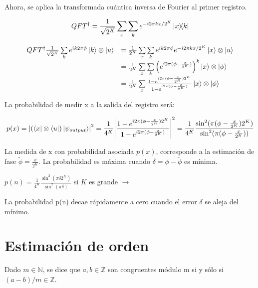 Ahora, se aplica la transformada cuántica inversa de Fourier al primer registro.

\begin{equation}
    QFT^\dagger = \frac{1}{\sqrt{2^K}} \sum\limits_x\sum\limits_k e^{-i 2\pi k x / 2^K} \ketbra{x}{k}
\end{equation}

\begin{equation}
\begin{array}{r l}
    QFT^\dagger \frac{1}{\sqrt{2^K}} \sum\limits_k e^{i k 2\pi \phi} \ket{k} \otimes \ket{u} &= \frac{1}{2^K} \sum\limits_x \sum\limits_k e^{i k 2\pi \phi} e^{-i 2\pi k x / 2^K} \ket{x} \otimes \ket{u} \\
    &= \frac{1}{2^K} \sum\limits_x\sum\limits_k \left(e^{i 2\pi (\phi - \frac{x}{2^K})}\right)^k \ket{x} \otimes \ket{\phi} \\
    &= \frac{1}{2^K} \sum\limits_x \frac{1 - e^{i 2\pi (\phi - \frac{x}{2^K}) 2^K}}{1 - e^{i 2\pi (\phi - \frac{x}{2^K})}} \ket{x} \otimes \ket{\phi} \\
\end{array}
\end{equation}

La probabilidad de medir x a la salida del registro será:

\begin{equation}
    p(x) = \abs{(\bra{x} \otimes \bra{u}) \ket{\psi_{output}}}^2 = \frac{1}{4^K} \abs{\frac{1 - e^{i 2\pi (\phi - \frac{x}{2^K})2^K}}{1 - e^{i 2\pi (\phi - \frac{x}{2^K})}}}^2 = \frac{1}{4^{K}} \frac{\sin^2(\pi (\phi - \frac{x}{2^K}) 2^K)}{\sin^2(\pi (\phi - \frac{x}{2^K}))}
\end{equation}

La medida de x con probabilidad asociada $p(x)$, corresponde a la estimación de fase $\tilde{\phi} = \frac{x}{2^K}$. La probabilidad es máxima cuando $\delta = \phi - \tilde{\phi}$ es mínima.

$p(n) = \frac{1}{4^K} \frac{\sin^2(\pi \delta 2^K)}{\sin^2(\pi \delta)}$ si $K$ es grande $\rightarrow$ %

La probabilidad p(n) decae rápidamente a cero cuando el error $\delta$ se aleja del mínimo.

\section{Estimación de orden}

Dado $m \in \mathds{N}$, se dice que $a,b \in \mathds{Z}$ son congruentes módulo m si y sólo si $(a-b)/m \in \mathds{Z}$.

